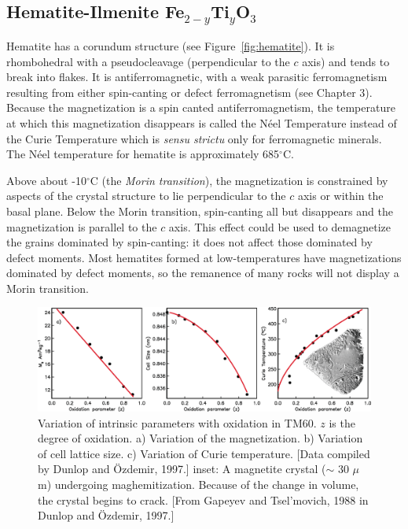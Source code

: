 \subsection {Hematite-Ilmenite Fe$_{2-y}$Ti$_y$O$_3$}
\label{sect:hemo}

%
Hematite has a corundum  structure (see Figure~\ref{fig:hematite}).  It is rhombohedral with a pseudocleavage
(perpendicular to the $c$ axis) and  tends to break into flakes.  
It is
antiferromagnetic, with a weak 
parasitic ferromagnetism  resulting from either 
spin-canting or 
defect ferromagnetism (see Chapter 3).
 Because the magnetization is a spin canted antiferromagnetism, the temperature at which this magnetization disappears is called the 
 N\'eel Temperature instead of the Curie Temperature which is {\it sensu strictu} only for ferromagnetic minerals.  
The N\'eel temperature for hematite is approximately 685$^{\circ}$C.  


  Above about -10$^{\circ}$C (the 
%
{\it Morin
transition}), the magnetization is constrained by aspects of the crystal
structure to lie
perpendicular to the $c$ axis or within the basal plane.  Below the Morin transition, 
spin-canting all but disappears
and the magnetization is parallel to the $c$ axis.  This effect could be used to
demagnetize the grains dominated by spin-canting: it 
does not affect those dominated by defect
moments.   Most hematites  formed at  low-temperatures have magnetizations dominated by defect moments, so the remanence of many rocks will not display a Morin transition.


 \begin{figure}[h!tb]
\centering  \includegraphics[width=14 cm]{EPSfiles/Z.eps}
\caption{Variation of intrinsic parameters with oxidation in TM60.  $z$ is the degree of oxidation.  a) Variation of the magnetization.   b) Variation of cell lattice size.  c) Variation of Curie temperature. [Data compiled by Dunlop and \"Ozdemir, 1997.]  inset: A magnetite crystal ($\sim$ 30 $\mu$m) undergoing maghemitization.  Because of the change in volume, the crystal begins to crack. [From Gapeyev and Tsel'movich, 1988 in Dunlop and \"Ozdemir, 1997.]}
\label{fig:Z}
\end{figure}\nocite{gapeyev88}


